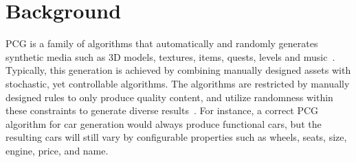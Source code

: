 \chapter{Background}







PCG is a family of algorithms that automatically and randomly generates synthetic media such as 3D models, textures, items, quests, levels and music~\cite[p.1]{pcg_in_games}.
Typically, this generation is achieved by combining manually designed assets with stochastic, yet controllable algorithms.
The algorithms are restricted by manually designed rules to only produce quality content, and utilize randomness within these constraints to generate diverse results~\cite{gamasutra}.
For instance, a correct PCG algorithm for car generation would always produce functional cars, but the resulting cars will still vary by configurable properties such as wheels, seats, size, engine, price, and name.

